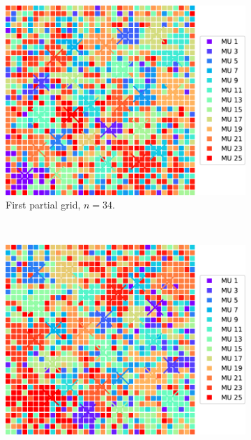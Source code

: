 \begin{figure}%
  \centering%
  \begin{subfigure}[t]{0.48\textwidth}%
    \centering%
    \includegraphics[width=\textwidth]{images/motor_unit_assignment/MU_fibre_distribution_combined_67x67_100_0_2d_fiber_distribution_.pdf}%
    \caption{First partial grid, $n=34$.}%
    \label{fig:mu_3partial_1}%
  \end{subfigure}
  \,
  \begin{subfigure}[t]{0.48\textwidth}%
    \centering%
    \includegraphics[width=\textwidth]{images/motor_unit_assignment/MU_fibre_distribution_combined_67x67_100_1_2d_fiber_distribution_.pdf}%

\end{subfigure}
\end{figure}
